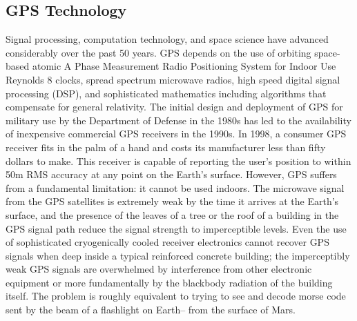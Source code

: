\documentclass[12pt]{article}
\begin{document}
\subsection{GPS Technology}
Signal processing, computation technology, and space science have advanced considerably over the past 50 years. GPS depends on the use of orbiting space-based atomic  A Phase Measurement Radio Positioning System for Indoor Use Reynolds 8 clocks, spread spectrum microwave radios, high speed digital signal processing (DSP), and sophisticated mathematics including algorithms that compensate for general relativity. The initial design and deployment of GPS for military use by the Department of
Defense in the 1980s has led to the availability of inexpensive commercial GPS receivers in the 1990s. In 1998, a consumer GPS receiver fits in the palm of a hand and costs its manufacturer less than fifty dollars to make. This receiver is capable of reporting the user’s position to within 50m RMS accuracy at any point on the Earth’s surface.  However, GPS suffers from a fundamental limitation: it cannot be used indoors. The microwave signal from the GPS satellites is extremely weak by the time it arrives at the Earth’s surface, and the presence of the leaves of a tree or the roof of a building in the GPS signal path reduce the signal strength to imperceptible levels. Even the use of sophisticated cryogenically cooled receiver electronics cannot recover GPS signals when deep inside a typical reinforced concrete building; the imperceptibly weak GPS signals are overwhelmed by interference from other electronic equipment or more fundamentally by the blackbody radiation of the building itself. The problem is roughly equivalent to trying to see and decode morse code sent by the beam of a flashlight on Earth-- from the surface of Mars. 
\end{document}
